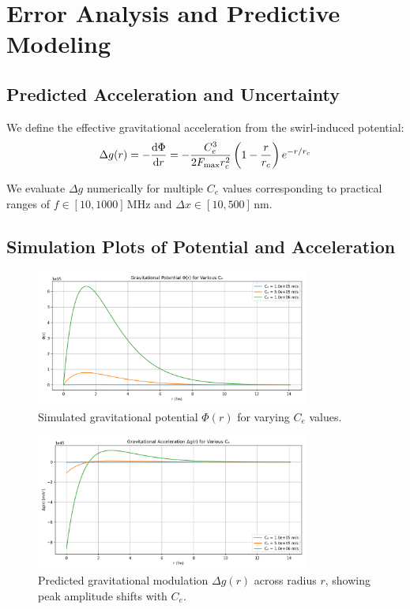     \section*{Error Analysis and Predictive Modeling}

    \subsection*{Predicted Acceleration and Uncertainty}
    We define the effective gravitational acceleration from the swirl-induced potential:
    \begin{equation}
        \Delta g(r) = -\dv{\Phi}{r} = -\frac{C_e^3}{2 F_{\text{max}} r_c^2} \left(1 - \frac{r}{r_c}\right) e^{-r/r_c}
    \end{equation}

    We evaluate \( \Delta g \) numerically for multiple \( C_e \) values corresponding to practical ranges of \( f \in [10, 1000]\,\text{MHz} \) and \( \Delta x \in [10, 500]\,\text{nm} \).

    \subsection*{Simulation Plots of Potential and Acceleration}

    \begin{figure}[h!]
        \centering
        \includegraphics[width=0.8\textwidth]{images/plotG}
        \caption{Simulated gravitational potential \( \Phi(r) \) for varying \( C_e \) values.}
    \end{figure}

    \begin{figure}[h!]
        \centering
        \includegraphics[width=0.8\textwidth]{images/plotG2}
        \caption{Predicted gravitational modulation \( \Delta g(r) \) across radius \( r \), showing peak amplitude shifts with \( C_e \).}
    \end{figure}

